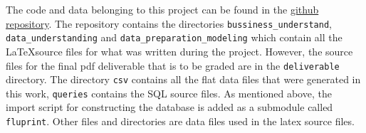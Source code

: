 The code and data belonging to this project can be found in the \href{https://github.com/Vinkage/fluprint_exploration}{github repository}.
The repository contains the directories \lstinline{bussiness_understand}, \lstinline{data_understanding} and \lstinline{data_preparation_modeling} which contain all the \LaTeX source files for what was written during the project.
However, the source files for the final pdf deliverable that is to be graded are in the \lstinline{deliverable} directory.
The directory \lstinline{csv} contains all the flat data files that were generated in this work, \lstinline{queries} contains the SQL source files.
As mentioned above, the import script for constructing the database is added as a submodule called \lstinline{fluprint}.
Other files and directories are data files used in the latex source files.

\printbibliography

